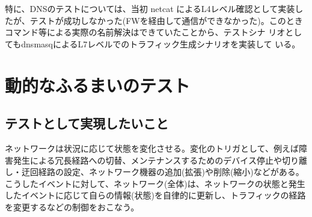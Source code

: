 特に、DNSのテストについては、当初 netcat によるL4レベル確認として実装し
たが、テストが成功しなかった(FWを経由して通信ができなかった)。このとき
コマンド等による実際の名前解決はできていたことから、テストシナ
リオとしてもdnsmasqによるL7レベルでのトラフィック生成シナリオを実装して
いる。

 \section{動的なふるまいのテスト}

  \subsection{テストとして実現したいこと}
  \label{sec:dynamic-test-target}
ネットワークは状況に応じて状態を変化させる。変化のトリガとして、例えば障
害発生による冗長経路への切替、メンテナンスするためのデバイス停止や切り離
し・迂回経路の設定、ネットワーク機器の追加(拡張)や削除(縮小)などがある。
こうしたイベントに対して、ネットワーク(全体)は、ネットワークの状態と発生
したイベントに応じて自らの情報(状態)を自律的に更新し、トラフィックの経路
を変更するなどの制御をおこなう。


